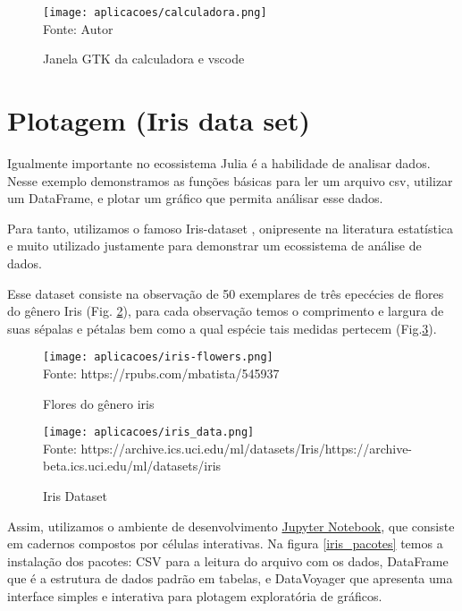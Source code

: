 \begin{figure}[H]
   \begin{center}
       \caption{Janela GTK da calculadora e vscode} \label{calculadora}
       \texttt{[image: aplicacoes/calculadora.png]} \\
       {\tiny \sf Fonte: Autor}
   \end{center}
  \end{figure}






\section{Plotagem (Iris data set)}
Igualmente importante no ecossistema Julia é a habilidade de analisar dados. Nesse exemplo demonstramos as funções básicas para ler um arquivo csv, utilizar um DataFrame, e plotar um gráfico que permita análisar esse dados. 

Para tanto, utilizamos o famoso Iris-dataset \cite{Fisher1936}, onipresente na literatura estatística e muito utilizado justamente para demonstrar um ecossistema de análise de dados. 

Esse dataset consiste na observação de 50 exemplares de três epecécies de flores do gênero Iris (Fig. \ref{iris_flowers}), para cada observação temos o comprimento e largura de suas sépalas e pétalas bem como a qual espécie tais medidas pertecem (Fig.\ref{iris_data}).

\begin{figure}[H]
   \begin{center}
       \caption{Flores do gênero iris} \label{iris_flowers}
       \texttt{[image: aplicacoes/iris-flowers.png]} \\
       {\tiny \sf Fonte: https://rpubs.com/mbatista/545937}
   \end{center}
\end{figure}

\begin{figure}[H]
   \begin{center}
       \caption{Iris Dataset} \label{iris_data}
       \texttt{[image: aplicacoes/iris\_data.png]} \\
       {\tiny \sf Fonte: https://archive.ics.uci.edu/ml/datasets/Iris/https://archive-beta.ics.uci.edu/ml/datasets/iris}
   \end{center}
\end{figure}

Assim, utilizamos o ambiente de desenvolvimento \href{https://jupyter.org/}{Jupyter Notebook}, que consiste em cadernos compostos por células interativas. 
Na figura \ref{iris_pacotes} temos a instalação dos pacotes: CSV para a leitura do arquivo com os dados, DataFrame que é a estrutura de dados padrão em tabelas, e DataVoyager que apresenta uma interface simples e interativa para plotagem exploratória de gráficos.

